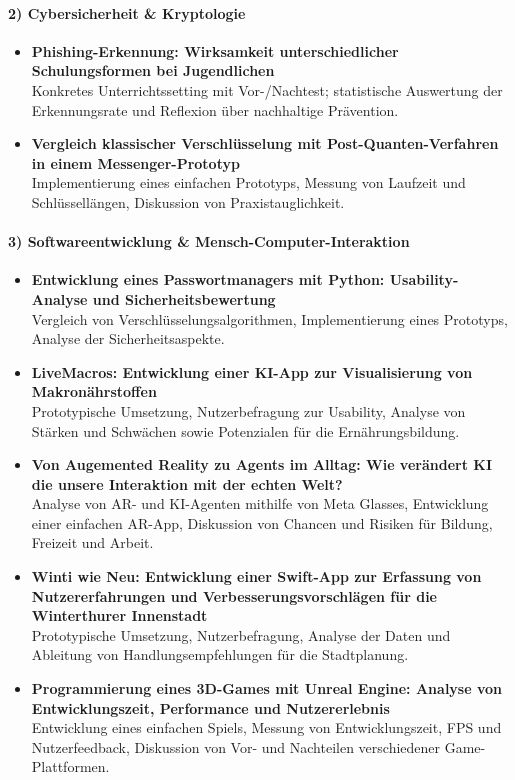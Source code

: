 \paragraph{2) Cybersicherheit \& Kryptologie}
\begin{itemize}
    \item[\faStar] \textbf{Phishing-Erkennung: Wirksamkeit unterschiedlicher Schulungsformen bei Jugendlichen}\\
    Konkretes Unterrichtssetting mit Vor-/Nachtest; statistische Auswertung der Erkennungsrate und Reflexion über nachhaltige Prävention.
    \item \textbf{Vergleich klassischer Verschlüsselung mit Post-Quanten-Verfahren in einem Messenger-Prototyp}\\
    Implementierung eines einfachen Prototyps, Messung von Laufzeit und Schlüssellängen, Diskussion von Praxistauglichkeit.
\end{itemize}

\paragraph{3) Softwareentwicklung \& Mensch-Computer-Interaktion}
\begin{itemize}
    \item[\faStar] \textbf{Entwicklung eines Passwortmanagers mit Python: Usability-Analyse und Sicherheitsbewertung}\\
    Vergleich von Verschlüsselungsalgorithmen, Implementierung eines Prototyps, Analyse der Sicherheitsaspekte.
    \item[\faStar] \textbf{LiveMacros: Entwicklung einer KI-App zur Visualisierung von Makronährstoffen}\\
    Prototypische Umsetzung, Nutzerbefragung zur Usability, Analyse von Stärken und Schwächen sowie Potenzialen für die Ernährungsbildung.
    \item[\faStar] \textbf{Von Augemented Reality zu Agents im Alltag: Wie verändert KI die unsere Interaktion mit der echten Welt?}\\
    Analyse von AR- und KI-Agenten mithilfe von Meta Glasses, Entwicklung einer einfachen AR-App, Diskussion von Chancen und Risiken für Bildung, Freizeit und Arbeit.
    \item[\faStar] \textbf{Winti wie Neu: Entwicklung einer Swift-App zur Erfassung von Nutzererfahrungen und Verbesserungsvorschlägen für die Winterthurer Innenstadt}\\
    Prototypische Umsetzung, Nutzerbefragung, Analyse der Daten und Ableitung von Handlungsempfehlungen für die Stadtplanung.
    \item[\faStar] \textbf{Programmierung eines 3D-Games mit Unreal Engine: Analyse von Entwicklungszeit, Performance und Nutzererlebnis}\\
    Entwicklung eines einfachen Spiels, Messung von Entwicklungszeit, FPS und Nutzerfeedback, Diskussion von Vor- und Nachteilen verschiedener Game-Plattformen.
\end{itemize}

